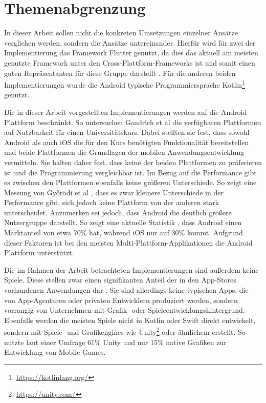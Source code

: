 \section{Themenabgrenzung}
\label{cha:3_3abgrenzung}
In dieser Arbeit sollen nicht die konkreten Umsetzungen einzelner Ansätze verglichen werden, sondern die Ansätze untereinander. Hierfür wird für zwei der Implementierung das Framework Flutter genutzt, da dies das aktuell am meisten genutzte Framework unter den Cross-Plattform-Frameworks ist und somit einen guten Repräsentanten für diese Gruppe darstellt \cite{statist_CP_Framework}. Für die anderen beiden Implementierungen wurde die Android typische Programmiersprache Kotlin\footnote{\url{https://kotlinlang.org/}} genutzt. 

Die in dieser Arbeit vorgestellten Implementierungen werden auf die Android Plattform beschränkt. 
So untersuchen Goadrich et al \cite{iOSvsAndroid} die verfügbaren Plattformen auf Nutzbarkeit für einen Universitätskurs. 
Dabei stellten sie fest, dass sowohl Android als auch iOS die für den Kurs benötigten Funktionalität bereitstellen und beide Plattformen die Grundlagen der mobilen Anwendungsentwicklung vermitteln. Sie halten daher fest, dass keine der beiden Plattformen zu präferieren ist und die Programmierung vergleichbar ist.
Im Bezug auf die Performance gibt es zwischen den Plattformen ebenfalls keine größeren Unterschiede. So zeigt eine Messung von Győrödi et al \cite{Android_IOS_Performance_comparison}, dass es zwar kleinere Unterschiede in der Performance gibt, sich jedoch keine Plattform von der anderen stark unterscheidet.
Anzumerken sei jedoch, dass Android die deutlich größere Nutzergruppe darstellt. So zeigt eine aktuelle Statistik \cite{statist_OS_worldwide}, dass Android einen Marktanteil von etwa 70\% hat, während iOS nur auf 30\% kommt. Aufgrund dieser Faktoren ist bei den meisten Multi-Plattform-Applikationen die Android Plattform unterstützt.

Die im Rahmen der Arbeit betrachteten Implementierungen sind außerdem keine Spiele. Diese stellen zwar einen signifikanten Anteil der in den App-Stores vorhandenen Anwendungen dar \cite{statist_games_appstore}. Sie sind allerdings keine typischen Apps, die von App-Agenturen oder privaten Entwicklern produziert werden, sondern vorrangig von Unternehmen mit Grafik- oder Spieleentwicklungshintergrund. Ebenfalls werden die meisten Spiele nicht in Kotlin oder Swift direkt entwickelt, sondern mit Spiele- und Grafikengines wie Unity\footnote{\url{https://unity.com/}} oder ähnlichem erstellt. So nutzte laut einer Umfrage \cite{unity_percantage_game_enginge} 61\% Unity und nur 15\% native Grafiken zur Entwicklung von Mobile-Games.

